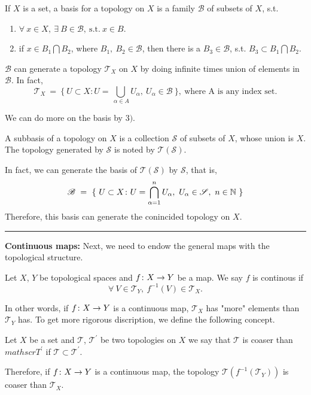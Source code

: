 \documentclass[a4paper,11pt]{report}
\begin{document}
\begin{defn}
If $X$ is a set, a basis for a topology on $X$ is a family $\mathscr{B}$ of subsets of $X$, s.t.
	\begin{enumerate}[label=\arabic*)]
		\item $\forall ~ x \in X,~ \exists ~ B \in \mathscr{B},~\text{s.t.}~ x \in B$.
		\item if $x \in B_1 \bigcap B_2$, where $B_1,~B_2 \in \mathscr{B}$, then there is a $B_3 \in \mathscr{B}$, s.t. $B_3 \subset B_1 \bigcap B_2$.
	\end{enumerate}
\end{defn}

$\mathscr{B}$ can generate a topology $\mathscr{T}_X$ on $X$ by doing infinite times union of elements in $\mathscr{B}$. In fact,
\begin{equation*}
	\mathscr{T}_X~ = ~\{~U \subset X \colon U = \bigcup_{~\alpha \in A}U_\alpha,~U_\alpha \in \mathscr{B}~\},~ \text{where A is any index set.}
\end{equation*}

We can do more on the basis by $3)$.
\begin{defn}
A subbasis of a topology on $X$ is a collection $\mathscr{S}$ of subsets of $X$, whose union is $X$. The topology generated by $\mathscr{S}$ is noted by $\mathscr{T}(\mathscr{S})$.
\end{defn}
In fact, we can generate the basis of $\mathscr{T}(\mathscr{S})$ by $\mathscr{S}$, that is,
\begin{equation*}
	\mathscr{B}~ = ~\{~U \subset X \colon U = \bigcap_{\alpha=1}^{n}U_\alpha,~U_\alpha \in \mathscr{S},~n \in \mathbb{N}~\}
\end{equation*}
Therefore, this basis can generate the conincided topology on $X$.\vspace{0.2in}

\rule{1mm}{1mm} \textbf{Continuous maps:} Next, we need to endow the general maps with the topological structure.
\begin{defn}
Let $X$, $Y$ be topological spaces and $f \colon X \rightarrow Y$ be a map. We say $f$ is continous if
	\begin{equation*}
		\forall ~V \in \mathscr{T}_Y,~f^{-1}(V) \in \mathscr{T}_X.
	\end{equation*}
\end{defn} 
In other words, if $f \colon X \rightarrow Y$ is a continuous map, $\mathscr{T}_X$ has "more" elements than $\mathscr{T}_Y$ has. To get more rigorous discription, we define the following concept.
\begin{defn}
	Let $X$ be a set and $\mathscr{T}$, $\mathscr{T}^{'}$ be two topologies on $X$ we say that $\mathscr{T}$ is coaser than $mathscr{T}^{'}$ if $\mathscr{T} \subset \mathscr{T}^{'}$.
\end{defn}
Therefore, if $f \colon X \rightarrow Y$ is a continuous map, the topology $\mathscr{T}(f^{-1}(\mathscr{T}_Y))$ is coaser than $\mathscr{T}_X$. \vspace{0.1in}
\end{document}
